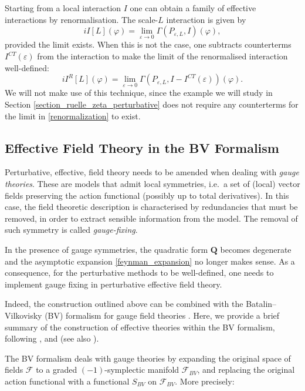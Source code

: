 \documentclass[reqno]{amsart}
\theoremstyle{definition}
\theoremstyle{remark}
\renewcommand{\epsilon}{\varepsilon}
\renewcommand{\phi}{\varphi}
\newcommand{\F}{\mathcal{F}}
\begin{document}
    
\begin{rmk}
Starting from a local interaction $I$ one can obtain a family of effective interactions by renormalisation. The scale-$L$ interaction is given by 
\begin{equation}
\label{renormalization}
    iI[L](\phi) = \lim_{\epsilon\to 0}\Gamma(P_{\epsilon,L},I)(\phi),
\end{equation}
provided the limit exists. When this is not the case, one subtracts counterterms $I^{CT}(\epsilon)$ from the interaction to make the limit of the renormalised interaction well-defined:
$$iI^R[L](\phi) = \lim_{\epsilon\to 0}\Gamma(P_{\epsilon,L},I-I^{CT}(\epsilon))(\phi).$$
We will not make use of this technique, since the example we will study in Section \ref{section_ruelle_zeta_perturbative} does not require any counterterms for the limit in \eqref{renormalization} to exist.
\end{rmk}



\subsection{Effective Field Theory in the BV Formalism}
\label{EFT_BV}

Perturbative, effective, field theory needs to be amended when dealing with \emph{gauge theories}. These are models that admit local symmetries, i.e.\ a set of (local) vector fields preserving the action functional (possibly up to total derivatives). In this case, the field theoretic description is characterised by redundancies that must be removed, in order to extract sensible information from the model. The removal of such symmetry is called \emph{gauge-fixing}.

In the presence of gauge symmetries, the quadratic form $\mathbf{Q}$ becomes degenerate \cite{henneaux_teitelboim} and the asymptotic expansion \eqref{feynman_expansion} no longer makes sense. As a consequence, for the perturbative methods to be well-defined, one needs to implement gauge fixing in perturbative effective field theory. 

Indeed, the construction outlined above can be combined with the Batalin--Vilkovisky (BV) formalism for gauge field theories \cite{BV81,BV83}. Here, we provide a brief summary of the construction of effective theories within the BV formalism, following \cite{costello2,costello}, and \cite{mnev} (see also \cite{ZinnJustin}).


The BV formalism deals with gauge theories by expanding the original space of fields $\F$ to a graded $(-1)$-symplectic manifold $\F_{BV}$, and replacing the original action functional with a functional $S_{BV}$ on $\F_{BV}$. More precisely:
\end{document}
